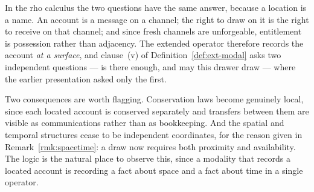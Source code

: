 In the rho calculus the two questions have the same answer, because a
location is a name.  An account is a message on a channel; the right to
draw on it is the right to receive on that channel; and since fresh
channels are unforgeable, entitlement is possession rather than adjacency.
The extended operator therefore records the account \emph{at a surface},
and clause~(v) of Definition~\ref{def:ext-modal} asks two independent
questions --- is there enough, and may this drawer draw --- where the
earlier presentation asked only the first.

Two consequences are worth flagging.  Conservation laws become genuinely
local, since each located account is conserved separately and transfers
between them are visible as communications rather than as bookkeeping.
And the spatial and temporal structures cease to be independent
coordinates, for the reason given in Remark~\ref{rmk:spacetime}: a draw
now requires both proximity and availability.  The logic is the natural
place to observe this, since a modality that records a located account is
recording a fact about space and a fact about time in a single operator.


